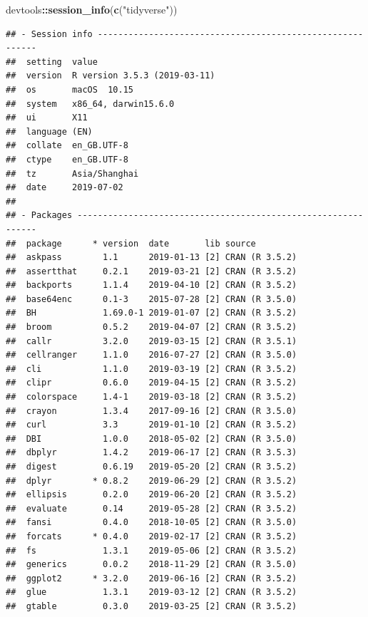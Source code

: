 \documentclass[]{book}
\newenvironment{Shaded}{\begin{snugshade}}{\end{snugshade}}
\newcommand{\KeywordTok}[1]{\textcolor[rgb]{0.13,0.29,0.53}{\textbf{#1}}}
\newcommand{\NormalTok}[1]{#1}
\newcommand{\OperatorTok}[1]{\textcolor[rgb]{0.81,0.36,0.00}{\textbf{#1}}}
\newcommand{\StringTok}[1]{\textcolor[rgb]{0.31,0.60,0.02}{#1}}
\begin{document}
\begin{Shaded}
\begin{Highlighting}[]
\NormalTok{devtools}\OperatorTok{::}\KeywordTok{session_info}\NormalTok{(}\KeywordTok{c}\NormalTok{(}\StringTok{"tidyverse"}\NormalTok{))}
\end{Highlighting}
\end{Shaded}

\begin{verbatim}
## - Session info ----------------------------------------------------------
##  setting  value                       
##  version  R version 3.5.3 (2019-03-11)
##  os       macOS  10.15                
##  system   x86_64, darwin15.6.0        
##  ui       X11                         
##  language (EN)                        
##  collate  en_GB.UTF-8                 
##  ctype    en_GB.UTF-8                 
##  tz       Asia/Shanghai               
##  date     2019-07-02                  
## 
## - Packages --------------------------------------------------------------
##  package      * version  date       lib source        
##  askpass        1.1      2019-01-13 [2] CRAN (R 3.5.2)
##  assertthat     0.2.1    2019-03-21 [2] CRAN (R 3.5.2)
##  backports      1.1.4    2019-04-10 [2] CRAN (R 3.5.2)
##  base64enc      0.1-3    2015-07-28 [2] CRAN (R 3.5.0)
##  BH             1.69.0-1 2019-01-07 [2] CRAN (R 3.5.2)
##  broom          0.5.2    2019-04-07 [2] CRAN (R 3.5.2)
##  callr          3.2.0    2019-03-15 [2] CRAN (R 3.5.1)
##  cellranger     1.1.0    2016-07-27 [2] CRAN (R 3.5.0)
##  cli            1.1.0    2019-03-19 [2] CRAN (R 3.5.2)
##  clipr          0.6.0    2019-04-15 [2] CRAN (R 3.5.2)
##  colorspace     1.4-1    2019-03-18 [2] CRAN (R 3.5.2)
##  crayon         1.3.4    2017-09-16 [2] CRAN (R 3.5.0)
##  curl           3.3      2019-01-10 [2] CRAN (R 3.5.2)
##  DBI            1.0.0    2018-05-02 [2] CRAN (R 3.5.0)
##  dbplyr         1.4.2    2019-06-17 [2] CRAN (R 3.5.3)
##  digest         0.6.19   2019-05-20 [2] CRAN (R 3.5.2)
##  dplyr        * 0.8.2    2019-06-29 [2] CRAN (R 3.5.2)
##  ellipsis       0.2.0    2019-06-20 [2] CRAN (R 3.5.2)
##  evaluate       0.14     2019-05-28 [2] CRAN (R 3.5.2)
##  fansi          0.4.0    2018-10-05 [2] CRAN (R 3.5.0)
##  forcats      * 0.4.0    2019-02-17 [2] CRAN (R 3.5.2)
##  fs             1.3.1    2019-05-06 [2] CRAN (R 3.5.2)
##  generics       0.0.2    2018-11-29 [2] CRAN (R 3.5.0)
##  ggplot2      * 3.2.0    2019-06-16 [2] CRAN (R 3.5.2)
##  glue           1.3.1    2019-03-12 [2] CRAN (R 3.5.2)
##  gtable         0.3.0    2019-03-25 [2] CRAN (R 3.5.2)

\end{verbatim}
\end{document}
